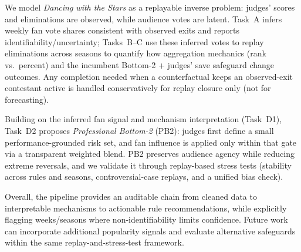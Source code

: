 We model \emph{Dancing with the Stars} as a replayable inverse problem: judges' scores and eliminations are observed,
while audience votes are latent. Task~A infers weekly fan vote shares consistent with observed exits and reports
identifiability/uncertainty; Tasks~B--C use these inferred votes to replay eliminations across seasons to quantify how
aggregation mechanics (rank vs.\ percent) and the incumbent Bottom-2 + judges' save safeguard change outcomes. Any
completion needed when a counterfactual keeps an observed-exit contestant active is handled conservatively for replay
closure only (not for forecasting).

Building on the inferred fan signal and mechanism interpretation (Task~D1), Task~D2 proposes \emph{Professional Bottom-2} (PB2):
judges first define a small performance-grounded risk set, and fan influence is applied only within that gate via a
transparent weighted blend. PB2 preserves audience agency while reducing extreme reversals, and we validate it through
replay-based stress tests (stability across rules and seasons, controversial-case replays, and a unified bias check).

Overall, the pipeline provides an auditable chain from cleaned data to interpretable mechanisms to actionable rule
recommendations, while explicitly flagging weeks/seasons where non-identifiability limits confidence. Future work can
incorporate additional popularity signals and evaluate alternative safeguards within the same replay-and-stress-test
framework.
